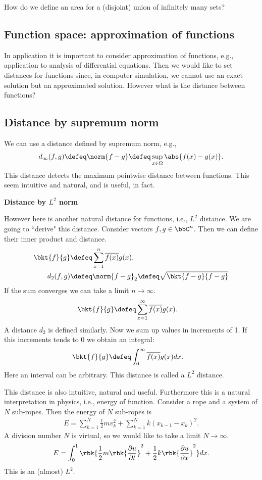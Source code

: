 \documentclass[openany, a4paper, oneside]{jsbook}
\begin{document}
How do we define an area for a (disjoint) union of infinitely many sets?
\subsection{Function space: approximation of functions}

In application it is important to consider approximation of functions,
e.g., application to analysis of differential equations.
Then we would like to set distances for functions since,
in computer simulation, we cannot use an exact solution but an approximated solution.
However what is the distance between functions?
\subsection{Distance by supremum norm}

We can use a distance defined by supremum norm, e.g.,
\begin{align}
 d_{\infty}(f, g)
 \defeq
 \norm{f - g}
 \defeq
 \sup_{x \in \Omega} \abs{f (x) - g (x)}.
\end{align}
This distance detects the maximum pointwise distance between functions.
This seem intuitive and natural, and is useful, in fact.

\vspace{1em}
\textbf{Distance by $L^2$ norm}

However here is another natural distance for functions, i.e., $L^2$ distance.
We are going to ``derive" this distance.
Consider vectors $f, g \in \bbC^n$.
Then we can define their inner product and distance.
\begin{align}
 \bkt{f}{g}
 &\defeq
 \sum_{x=1}^{n} \overline{f (x)} g (x), \\
 d_2 (f, g)
 &\defeq
 \norm{f - g}_2
 \defeq
 \sqrt{\bkt{f-g}{f-g}}
\end{align}
If the sum converges we can take a limit $n \to \infty$.
\begin{align}
 \bkt{f}{g}
 &\defeq
 \sum_{x=1}^{\infty} \overline{f (x)} g (x).
\end{align}
A distance $d_2$ is defined similarly.
Now we sum up values in increments of 1.
If this increments tends to 0 we obtain an integral:
\begin{align}
 \bkt{f}{g}
 &\defeq
 \int_0^{\infty} \overline{f (x)} g (x) dx.
\end{align}
Here an interval can be arbitrary.
This distance is called a $L^2$ distance.

This distance is also intuitive, natural and useful.
Furthermore this is a natural interpretation in physics, i.e., energy of function.
Consider a rope and a system of $N$ sub-ropes.
Then the energy of $N$ sub-ropes is
\begin{align}
 E
 =
 \sum_{k=1}^{N} \frac{1}{2} m v_k^2 + \sum_{k=1}^{N} k (x_{k-1} - x_{k})^2.
\end{align}
A division number $N$ is virtual, so we would like to take a limit $N \to \infty$.
\begin{align}
 E
 =
 \int_0^1 \rbk{\frac{1}{2} m \rbk{\frac{\partial u}{\partial t}}^2 + \frac{1}{2} k \rbk{\frac{\partial u}{\partial x}}^2} dx.
\end{align}
This is an (almost) $L^2$.
\end{document}
